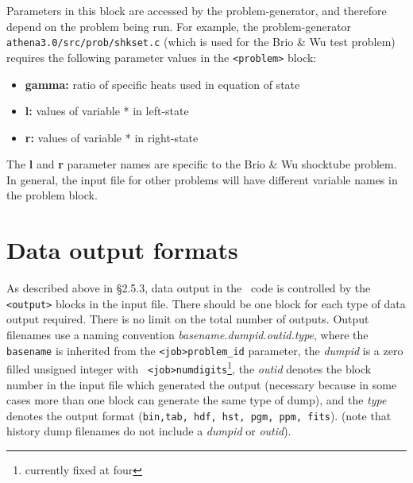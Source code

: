 Parameters in this block are accessed by the problem-generator,
and therefore depend on the problem being run.  For example, the 
problem-generator {\tt athena3.0/src/prob/shkset.c}
(which is used for the Brio \& Wu test problem)
requires the following parameter values in the {\tt <problem>} block:
\begin{itemize}
\item {\bf gamma:} ratio of specific heats used in equation of state
\item {\bf *l:} values of variable * in left-state
\item {\bf *r:} values of variable * in right-state
\end{itemize}
The {\bf *l} and {\bf *r} parameter names are specific to the Brio \& Wu shocktube
problem.  In general, the input file for other problems will have
different variable names in the problem block.

\section{Data output formats}

As described above in \S 2.5.3, data output in the 
\ath\ code is controlled by the {\tt <output>} blocks in the input file.
There should be one block for each type of data output required.  There is
no limit on the total number of outputs. 
Output filenames
use a naming convention {\it basename.dumpid.outid.type}, where
the {\tt basename} is inherited from the {\tt <job>problem\_id}
parameter, the {\it dumpid} is a zero filled unsigned integer with {\tt
<job>numdigits}\footnote{currently fixed at four}, the {\it outid} denotes the
block number in the input file which generated the output (necessary because
in some cases more than one block can generate the same type of dump),
and the {\it type} denotes
the output format ({\tt bin,tab, hdf, hst, pgm, ppm, fits}).
(note that history dump filenames do not include a {\it dumpid} or {\it outid}).


